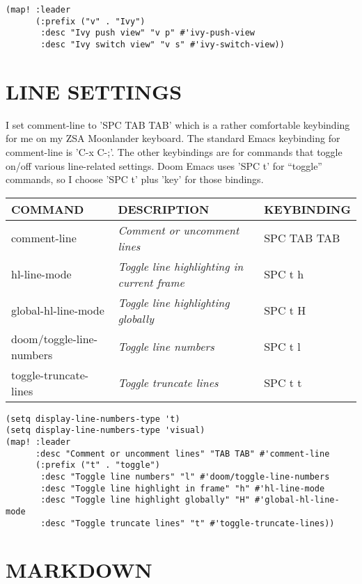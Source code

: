 \documentclass[11pt]{article}
\begin{document}
\begin{verbatim}
(map! :leader
      (:prefix ("v" . "Ivy")
       :desc "Ivy push view" "v p" #'ivy-push-view
       :desc "Ivy switch view" "v s" #'ivy-switch-view))
\end{verbatim}

\section{LINE SETTINGS}
\label{sec:org7361c03}
I set comment-line to 'SPC TAB TAB' which is a rather comfortable keybinding for me on my ZSA Moonlander keyboard.  The standard Emacs keybinding for comment-line is 'C-x C-;'.  The other keybindings are for commands that toggle on/off various line-related settings.  Doom Emacs uses 'SPC t' for ``toggle'' commands, so I choose 'SPC t' plus 'key' for those bindings.

\begin{center}
\begin{tabular}{lll}
COMMAND & DESCRIPTION & KEYBINDING\\[0pt]
\hline
comment-line & \emph{Comment or uncomment lines} & SPC TAB TAB\\[0pt]
hl-line-mode & \emph{Toggle line highlighting in current frame} & SPC t h\\[0pt]
global-hl-line-mode & \emph{Toggle line highlighting globally} & SPC t H\\[0pt]
doom/toggle-line-numbers & \emph{Toggle line numbers} & SPC t l\\[0pt]
toggle-truncate-lines & \emph{Toggle truncate lines} & SPC t t\\[0pt]
\end{tabular}
\end{center}

\begin{verbatim}
(setq display-line-numbers-type 't)
(setq display-line-numbers-type 'visual)
(map! :leader
      :desc "Comment or uncomment lines" "TAB TAB" #'comment-line
      (:prefix ("t" . "toggle")
       :desc "Toggle line numbers" "l" #'doom/toggle-line-numbers
       :desc "Toggle line highlight in frame" "h" #'hl-line-mode
       :desc "Toggle line highlight globally" "H" #'global-hl-line-mode
       :desc "Toggle truncate lines" "t" #'toggle-truncate-lines))
\end{verbatim}

\section{MARKDOWN}
\label{sec:org210b8a0}
\end{document}
